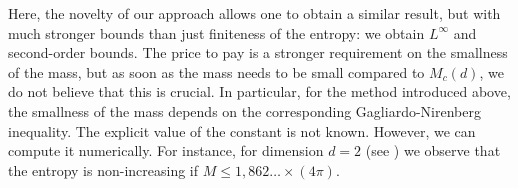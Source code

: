 \documentclass[11pt,a4paper]{article}
\numberwithin{equation}{section}
\newcommand{\R}{{\mathbb{R}}}
\theoremstyle{plain}
\newtheorem{corollary}[theorem]{Corollary}
\theoremstyle{remark}
\begin{document}
\bigskip
Here, the novelty of our approach allows one to obtain a similar result, but with much stronger bounds than just finiteness of the entropy: we obtain $L^\infty$ and second-order bounds. The price to pay is a stronger requirement on the smallness of the mass, but as soon as the mass needs to be small compared to $M_c(d)$, we do not believe that this is crucial. In particular, for the method introduced above, the smallness of the mass depends on the corresponding Gagliardo-Nirenberg inequality. The explicit value of the constant is not known. However, we can compute it numerically. For instance, for dimension $d=2$ (see \cite{Weinstein82})  we observe that the entropy is non-increasing if $M \leq 1,862 \ldots \times (4 \pi)$.








\end{document}
